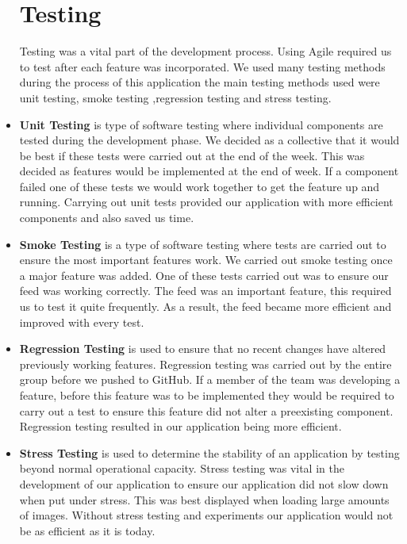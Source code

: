 \begin{itemize}
\section{Testing}
Testing was a vital part of the development process. Using Agile required us to test after each feature was incorporated. We used many testing methods during the process of this application the main testing methods used were unit testing, smoke testing ,regression testing and stress testing.

\item \textbf{Unit Testing}
 is type of software testing where individual components are tested during the development phase. \newline
We decided as a collective that it would be best if these tests were carried out at the end of the week. This was decided as features would be implemented at the end of week. If a component failed one of these tests we would work together to get the feature up and running. Carrying out unit tests provided our application with more efficient components and also saved us time.

\item \textbf{Smoke Testing}
 is a type of software testing where tests are carried out to ensure the most important features work.\newline
We carried out smoke testing once a major feature was added. One of these tests carried out was to ensure our feed was working correctly. The feed was an important feature, this required us to test it quite frequently. As a result, the feed became more efficient and improved with every test.

\item \textbf{Regression Testing}
 is used to ensure that no recent changes have altered previously working features.\newline
Regression testing was carried out by the entire group before we pushed to GitHub. If a member of the team was developing a feature, before this feature was to be implemented they would be required to carry out a test to ensure this feature did not alter a preexisting component. Regression testing resulted in our application being more efficient.

\item \textbf{Stress Testing}
 is used to determine the stability of an application by testing beyond normal operational capacity.\newline
Stress testing was vital in the development of our application to ensure our application did not slow down when put under stress. This was best displayed when loading large amounts of images. Without stress testing and experiments our application would not be as efficient as it is today.


\end{itemize}
